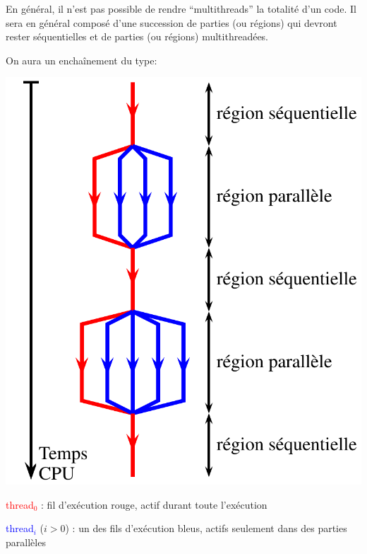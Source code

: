 \documentclass{beamer}
\begin{document}
\begin{frame}
	En général, il n'est pas possible de rendre ``multithreads'' la totalité d'un code. Il sera en général composé d'une succession de parties (ou régions) qui devront rester séquentielles et de parties (ou régions) multithreadées.
	\vfill
	
	On aura un enchaînement du type:
	
\begin{minipage}{0.48\textwidth}
	\includegraphics[scale=0.35]{../../Images/enchainement}
\end{minipage}
\begin{minipage}{0.50\textwidth}
	\textcolor{red}{thread${}_0$} : fil d'exécution rouge, actif durant toute l'exécution
	\medskip
	
	\textcolor{blue}{thread${}_i$} ($i > 0$) : un des fils d'exécution bleus, actifs seulement dans des parties parallèles
\end{minipage}
	 
\end{frame}
\end{document}
